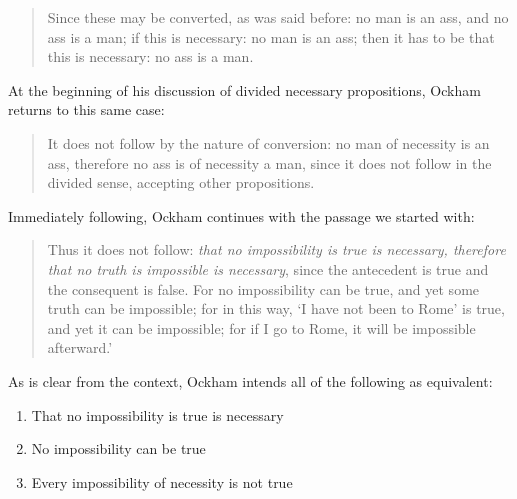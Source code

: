 \documentclass[a4paper]{article}
\begin{document}
\begin{quote}
Since these may be converted, as was said before: no man is an ass, and no ass is a man; if this is necessary: no man is an ass; then it has to be that this is necessary: no ass is a man. \cite[II. 24, p. 296]{OckhamSL2} 
\end{quote}

At the beginning of his discussion of divided necessary propositions, Ockham returns to this same case:

\begin{quote}
It does not follow by the nature of conversion: no man of necessity is an ass, therefore no ass is of necessity a man, since it does not follow in the divided sense, accepting other propositions. \cite[II. 24, p. 297]{OckhamSL2}
\end{quote}

Immediately following, Ockham continues with the passage we started with:
\begin{quote}
Thus it does not follow: \textit{that no impossibility is true is necessary, therefore that no truth is impossible is necessary}, since the antecedent is true and the consequent is false. For no impossibility can be true, and yet some truth can be impossible; for in this way, `I have not been to Rome' is true, and yet it can be impossible; for if I go to Rome, it will be impossible afterward.' \cite[II. 24, pp. 297-298]{OckhamSL2}
\end{quote}

As is clear from the context, Ockham intends all of the following as equivalent: 
\begin{enumerate}
\item That no impossibility is true is necessary

\item No impossibility can be true

\item Every impossibility of necessity is not true
\end{enumerate}
\end{document}
